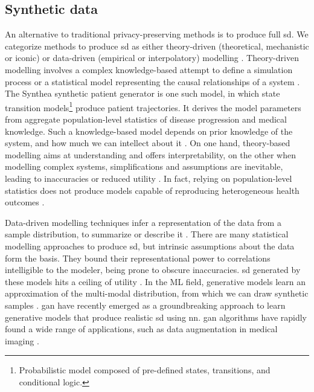     \subsection{Synthetic data}
        An alternative to traditional privacy-preserving methods is to produce full \gls{sd}. We categorize methods to produce \gls{sd} as either theory-driven (theoretical, mechanistic or iconic) or data-driven (empirical or interpolatory) modelling \cite{Kim_2017, Hand2019}. Theory-driven modelling involves a complex knowledge-based attempt to define a simulation process or a statistical model representing the causal relationships of a system \cite{Yousefi2018-dy, Kansal2018-dx}. The Synthea \cite{Walonoski_2017} synthetic patient generator is one such model, in which state transition models\footnote{Probabilistic model composed of pre-defined states, transitions, and conditional logic.} produce patient trajectories. It derives the model parameters from aggregate population-level statistics of disease progression and medical knowledge. Such a knowledge-based model depends on prior knowledge of the system, and how much we can intellect about it \cite{Kim_2017, Bonnery2019-ug}. On one hand, theory-based modelling aims at understanding and offers interpretability, on the other when modelling complex systems, simplifications and assumptions are inevitable, leading to inaccuracies or reduced utility \cite{Hand2019, Rankin2020}. In fact, relying on population-level statistics does not produce models capable of reproducing heterogeneous health outcomes \cite{Chen_2019}.\par
        
        Data-driven modelling techniques infer a representation of the data from a sample distribution, to summarize or describe it \cite{Hand2019}. There are many statistical modelling approaches to produce \gls{sd}, but intrinsic assumptions about the data form the basis. They bound their representational power to correlations intelligible to the modeler, being prone to obscure inaccuracies. \gls{sd} generated by these models hits a ceiling of utility \cite{Rankin2020}. In the ML field, generative models learn an approximation of the multi-modal distribution, from which we can draw synthetic samples  \cite{goodgan}. \Gls{gan} \cite{goodgan} have recently emerged as a groundbreaking approach to learn generative models that produce realistic \gls{sd} using \gls{nn}. \gls{gan} algorithms have rapidly found a wide range of applications, such as data augmentation in medical imaging \cite{Yi2019, Wang2020, Zhou2020}.\par
        
